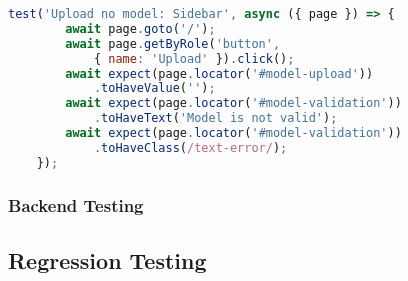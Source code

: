 \begin{center}
    \begin{lstlisting}[language=JavaScript, float=*htb, caption={Playwright Test Case Example}, label={lst:playwright-example}]
    test('Upload no model: Sidebar', async ({ page }) => {
        await page.goto('/');
        await page.getByRole('button', 
            { name: 'Upload' }).click();
        await expect(page.locator('#model-upload'))
            .toHaveValue('');
        await expect(page.locator('#model-validation'))
            .toHaveText('Model is not valid');
        await expect(page.locator('#model-validation'))
            .toHaveClass(/text-error/);
    });
    \end{lstlisting}
\end{center}

\subsubsection{Backend Testing}

\subsection{Regression Testing}

